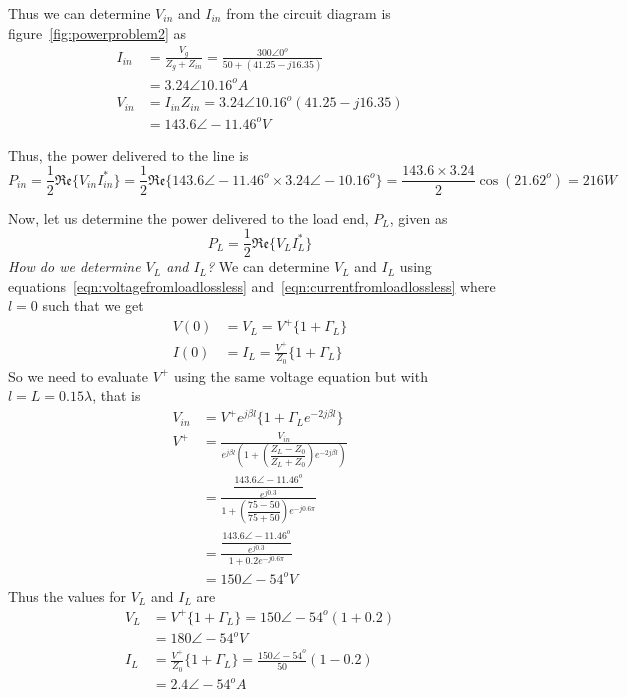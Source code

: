 \begin{exmp}
Thus we can determine $V_{in}$ and $I_{in}$ from the circuit diagram is figure~\ref{fig:powerproblem2} as
\begin{align*}
I_{in} &= \frac{V_g}{Z_g + Z_{in}} 
= \frac{300\angle0^o}{50 + (41.25 - j16.35)}\\
&= 3.24\angle10.16^oA\\
V_{in} &= I_{in}Z_{in} = 3.24\angle10.16^o(41.25 - j16.35)\\
&= 143.6\angle-11.46^oV
\end{align*}

Thus, the power delivered to the line is
\begin{dmath*}
P_{in} = \frac{1}{2}\mathfrak{Re}\lbrace V_{in}I_{in}^\ast\rbrace
= \frac{1}{2}\mathfrak{Re}\lbrace 143.6\angle-11.46^o\times3.24\angle-10.16^o\rbrace
=\frac{143.6\times3.24}{2}\cos(21.62^o)
= 216W
\end{dmath*}

Now, let us determine the power delivered to the load end, $P_L$, given as
\begin{dmath*}
P_L = \frac{1}{2}\mathfrak{Re}\lbrace V_L I_L^\ast\rbrace
\end{dmath*}
\emph{How do we determine $V_L$ and $I_L$?} We can determine $V_L$ and $I_L$ using equations~\eqref{eqn:voltagefromloadlossless} and~\eqref{eqn:currentfromloadlossless} where $l = 0$ such that we get
\begin{align*}
V(0) &= V_L = V^+\lbrace1 + \Gamma_L\rbrace\\
I(0) &= I_L = \frac{V^+}{Z_0}\lbrace1 + \Gamma_L\rbrace
\end{align*}
So we need to evaluate $V^+$ using the same voltage equation but with $l = L = 0.15\lambda$, that is
\begin{align*}
V_{in} &= V^+e^{j\beta l}\lbrace1 + \Gamma_Le^{-2j\beta l}\rbrace\\
V^+ &= \frac{V_{in}}{e^{j\beta l}\left(1+\left(\dfrac{Z_L - Z_0}{Z_L + Z_0}\right)e^{-2j\beta l}\right)}\\
&=\frac{\dfrac{143.6\angle-11.46^o}{e^{j0.3}}}{1+\left(\dfrac{75 - 50}{75 + 50}\right)e^{-j0.6\pi}}\\
&= \frac{\dfrac{143.6\angle-11.46^o}{e^{j0.3}}}{1+0.2e^{-j0.6\pi}}\\
&= 150\angle-54^oV
\end{align*}
Thus the values for $V_L$ and $I_L$ are
\begin{align*}
V_L &= V^+\lbrace1 + \Gamma_L\rbrace = 150\angle-54^o(1 + 0.2)\\
&= 180\angle-54^o V\\
I_L &= \frac{V^+}{Z_0}\lbrace1 + \Gamma_L\rbrace = \frac{150\angle-54^o}{50}(1 - 0.2)\\
&= 2.4\angle-54^oA
\end{align*}


\end{exmp}
